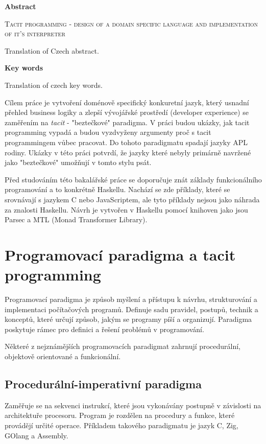\documentclass[male,czech]{kithesis}
\newcommand{\TITULen}{Tacit programming - design of a domain specific language and implementation of it's interpreter} %
\begin{document}
\vspace{1em}
\hrulefill
\vspace{1em}

\textbf{\textsf{Abstract}}

\textsc{\TITULen}

Translation of Czech abstract.

\textbf{\textsf{Key words}}

Translation of czech key words.

{

  \hypersetup{linkcolor=black}
  \tableofcontents
}


Cílem práce je vytvoření doménově specifický konkuretní jazyk, který usnadní přehled business logiky a zlepší 
vývojářské prostředí (developer experience) se zaměřením na \textit{tacit} - "beztečkové" paradigma.
V práci budou ukázky, jak
tacit programming vypadá a budou vyzdvyženy argumenty proč s tacit programmingem
vůbec pracovat.
Do tohoto paradigmatu spadají jazyky APL rodiny. 
Ukázky v této práci potvrdí, že jazyky které nebyly primárně navržené jako "beztečkové" 
umožňují v tomto stylu psát.

Před studováním této bakalářské práce se doporučuje znát základy funkcionálního programování a
to konkrétně Haskellu.
Nachází se zde příklady,
které se srovnávají s jazykem C nebo JavaScriptem,
ale tyto příklady nejsou jako náhrada za znalosti Haskellu.
Návrh je vytvořen v Haskellu pomocí knihoven jako
jsou Parsec a MTL (Monad Transformer Library).

\chapter{Programovací paradigma a tacit programming}

Programovací paradigma je způsob myšlení a přístupu k návrhu, 
strukturování a implementaci počítačových programů. 
Definuje sadu pravidel, postupů, technik a konceptů, které určují způsob,
jakým se programy píší a organizují. Paradigma poskytuje rámec pro definici a 
řešení problémů v programování.

Některé z nejznámějších programovacích paradigmat zahrnují 
procedurální, objektově orientované a funkcionální.

\section{Procedurální-imperativní paradigma}
Zaměřuje se na sekvenci instrukcí, 
které jsou vykonávány postupně
v závislosti na architektuře procesoru.
Program je rozdělen na procedury a funkce, 
které provádějí určité operace. 
Příkladem takového paradigmatu je jazyk C, 
Zig, 
GOlang a 
Assembly. 
\end{document}

